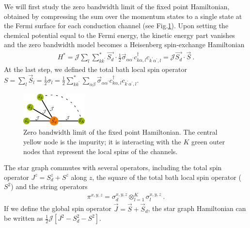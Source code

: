 \documentclass[reprint,prb,superscriptaddress]{revtex4-2}
\begin{document}
We will first study the zero bandwidth limit of the fixed point Hamiltonian, obtained by compressing the sum over the momentum states to a single state at the Fermi surface for each conduction channel (see Fig.\ref{fig:star graph}). Upon setting the chemical potential equal to the Fermi energy, the kinetic energy part vanishes and the zero bandwidth model becomes a Heisenberg spin-exchange Hamiltonian
\begin{equation}\begin{aligned}
	\label{star graph}
	H^* = {\mathcal{J}}\sum_l\sum_{kk^\prime}^* \vec{S_d}\cdot\frac{1}{2}\vec{\sigma}_{\alpha\alpha^\prime}c_{k\alpha,l}^\dagger c_{k^\prime\alpha^\prime, l} = {\mathcal{J}}\vec{S_d}\cdot\vec S~.
\end{aligned}\end{equation}
At the last step, we defined the total bath local spin operator \(S = \sum_l \vec{S}_l = \frac{1}{2}\sigma_l = \frac{1}{2}\sum_{kk^\prime}^*\sum_{\alpha\beta}\vec{\sigma}_{\alpha\alpha^\prime}c_{k\alpha,l}^\dagger c_{k^\prime\alpha^\prime, l}\).
\begin{figure}[htpb]
	\centering
	\includegraphics[width=0.30\textwidth]{stargraph.pdf}
	\caption{Zero bandwidth limit of the fixed point Hamiltonian. The central yellow node is the impurity; it is interacting with the \(K\) green outer nodes that represent the local spins of the channels.}
	\label{fig:star graph}
\end{figure}
The star graph commutes with several operators, including the total spin operator \(J^z = S_d^z + S^z\) along \(z\), the square of the total bath local spin operator (\(S^2\)) and the string operators 
\begin{equation}\begin{aligned}
\pi^{x,y,z} = \sigma_d^{x,y,z} \otimes_{l=1}^K \sigma_l^{x,y,z}~.
\end{aligned}\end{equation}
If we define the global spin operator \(\vec J = \vec S + \vec S_d\), the star graph Hamiltonian can be written as \(\frac{1}{2}\mathcal{J}\left[J^2 - S_d^2 - S^2\right] \).
\end{document}

